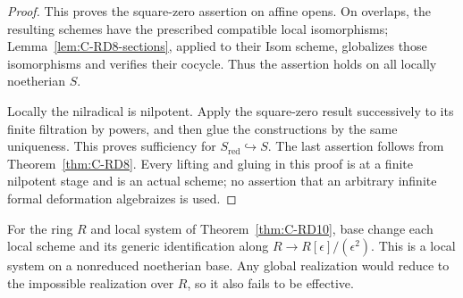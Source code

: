 \begin{proof}
This proves the square-zero assertion on affine opens. On overlaps,
the resulting schemes have the prescribed compatible local
isomorphisms; Lemma~\ref{lem:C-RD8-sections}, applied to their Isom
scheme, globalizes those isomorphisms and verifies their cocycle.
Thus the assertion holds on all locally noetherian $S$.

Locally the nilradical is nilpotent. Apply the square-zero result
successively to its finite filtration by powers, and then glue the
constructions by the same uniqueness. This proves sufficiency for
$S_{\mathrm{red}}\hookrightarrow S$. The last assertion follows
from Theorem~\ref{thm:C-RD8}. Every lifting and gluing in this proof
is at a finite nilpotent stage and is an actual scheme; no assertion
that an arbitrary infinite formal deformation algebraizes is used.
\end{proof}

\begin{remark}
For the ring $R$ and local system of Theorem~\ref{thm:C-RD10}, base
change each local scheme and its generic identification along
$R\to R[\epsilon]/(\epsilon^2)$. This is a local system on a
nonreduced noetherian base. Any global realization would reduce to
the impossible realization over $R$, so it also fails to be effective.
\end{remark}
